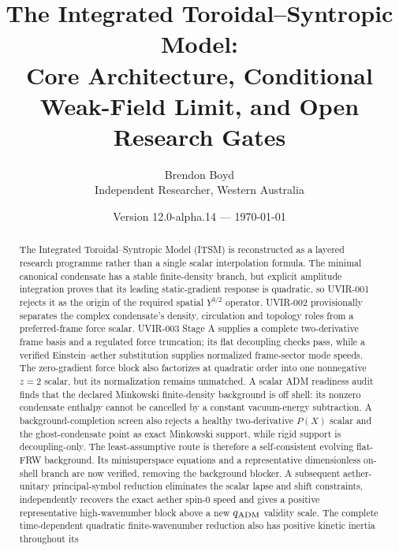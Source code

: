 \documentclass[11pt]{article}
\title{The Integrated Toroidal--Syntropic Model:\\
Core Architecture, Conditional Weak-Field Limit, and Open Research Gates}
\author{Brendon Boyd\\Independent Researcher, Western Australia}
\date{Version 12.0-alpha.14 --- \today}
\begin{document}
\maketitle

\begin{center}
\end{center}

\begin{abstract}
The Integrated Toroidal--Syntropic Model (ITSM) is reconstructed as a layered
research programme rather than a single scalar interpolation formula.  The
minimal canonical condensate has a stable finite-density branch, but explicit
amplitude integration proves that its leading static-gradient response is
quadratic, so UVIR-001 rejects it as the origin of the required spatial
$Y^{3/2}$ operator.  UVIR-002 provisionally separates the complex condensate's
density, circulation and topology roles from a preferred-frame force scalar.
UVIR-003 Stage A supplies a complete two-derivative frame basis and a regulated
force truncation; its flat decoupling checks pass, while a verified
Einstein--aether substitution supplies normalized frame-sector mode speeds.
The zero-gradient force block also factorizes at quadratic order into one
nonnegative $z=2$ scalar, but its normalization remains unmatched.  A scalar
ADM readiness audit finds that the declared Minkowski finite-density
background is off shell: its nonzero condensate enthalpy cannot be cancelled
by a constant vacuum-energy subtraction.  A background-completion screen also
rejects a healthy two-derivative $P(X)$ scalar and the ghost-condensate point
as exact Minkowski support, while rigid support is decoupling-only.  The
least-assumptive route is therefore a self-consistent evolving flat-FRW
background.  Its minisuperspace equations and a representative dimensionless
on-shell branch are now verified, removing the background blocker.  A
subsequent aether-unitary principal-symbol reduction eliminates the scalar
lapse and shift constraints, independently recovers the exact aether spin-0
speed and gives a positive representative high-wavenumber block above a new
$q_{\rm ADM}$ validity scale.  The complete time-dependent quadratic
finite-wavenumber reduction also has positive kinetic inertia throughout its

\end{abstract}
\end{document}
